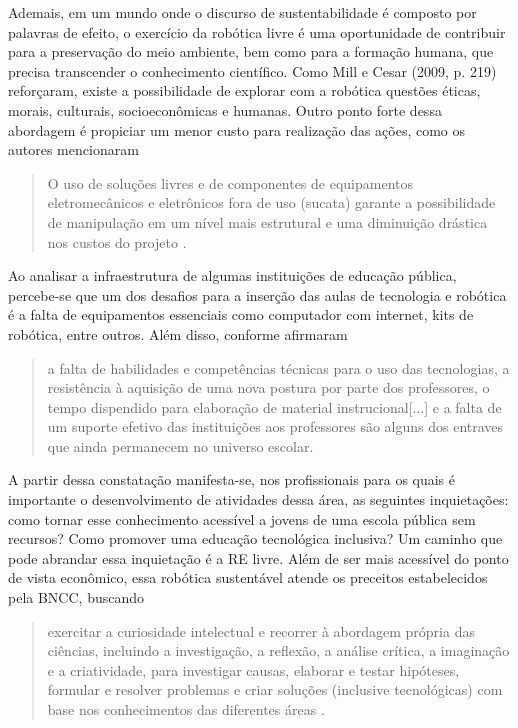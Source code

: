 \documentclass{textolivre-html}
\begin{document}
Ademais, em um mundo onde o discurso de sustentabilidade é composto por
palavras de efeito, o exercício da robótica livre é uma oportunidade de
contribuir para a preservação do meio ambiente, bem como para a formação
humana, que precisa transcender o conhecimento científico. Como Mill e Cesar
(2009, p. 219) reforçaram, existe a possibilidade de explorar com a robótica
questões éticas, morais, culturais, socioeconômicas e humanas. Outro ponto
forte dessa abordagem é propiciar um menor custo para realização das ações,
como os autores mencionaram
\begin{quote}
O uso de soluções livres e de componentes de equipamentos eletromecânicos e
eletrônicos fora de uso (sucata) garante a possibilidade de manipulação em um
nível mais estrutural e uma diminuição drástica nos custos do projeto \cite[p. 227]{mill2009}.
\end{quote}

Ao analisar a infraestrutura de algumas instituições de educação pública,
percebe-se que um dos desafios para a inserção das aulas de tecnologia e
robótica é a falta de equipamentos essenciais como computador com internet,
kits de robótica, entre outros. Além disso, conforme \textcite[p. 175]{ben2019} afirmaram
\begin{quote}
a falta de habilidades e competências técnicas para o uso das tecnologias, a
resistência à aquisição de uma nova postura por parte dos professores, o tempo
dispendido para elaboração de material instrucional[...] e a falta de um
suporte efetivo das instituições aos professores são alguns dos entraves que
ainda permanecem no universo escolar.
\end{quote}

A partir dessa constatação manifesta-se, nos profissionais para os quais é
importante o desenvolvimento de atividades dessa área, as seguintes
inquietações: como tornar esse conhecimento acessível a jovens de uma escola
pública sem recursos? Como promover uma educação tecnológica inclusiva? Um
caminho que pode abrandar essa inquietação é a RE livre. Além de ser mais
acessível do ponto de vista econômico, essa robótica sustentável atende os
preceitos estabelecidos pela BNCC, buscando
\begin{quote}
exercitar a curiosidade intelectual e recorrer à abordagem própria das
ciências, incluindo a investigação, a reflexão, a análise crítica, a imaginação
e a criatividade, para investigar causas, elaborar e testar hipóteses, formular
e resolver problemas e criar soluções (inclusive tecnológicas) com base nos
conhecimentos das diferentes áreas \cite[p. 9]{brasil2018}.
\end{quote}
\end{document}
